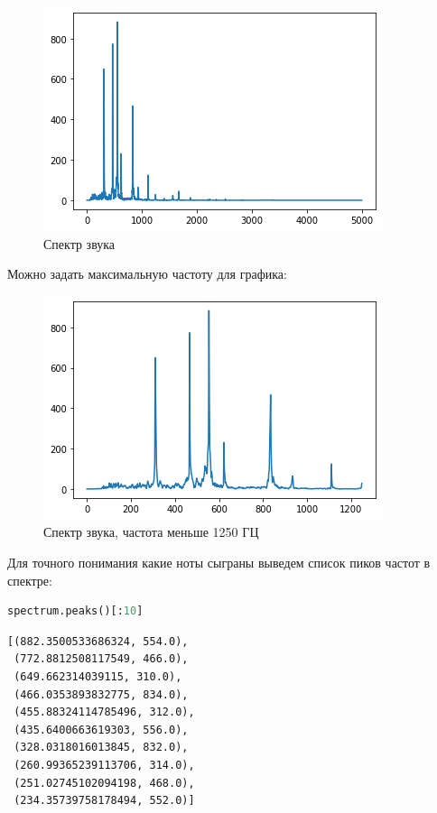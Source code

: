 \begin{figure}[H]
	\begin{center}
		\includegraphics[scale=1]{fig/lab01/lab01_11_0.png}
		\caption{Спектр звука}
	\end{center}
\end{figure}

Можно задать максимальную частоту для графика:

\begin{figure}[H]
	\begin{center}
		\includegraphics[scale=1]{fig/lab01/lab01_13_0.png}
		\caption{Спектр звука, частота меньше 1250 ГЦ}
	\end{center}
\end{figure}

Для точного понимания какие ноты сыграны выведем список пиков частот в спектре:

\begin{lstlisting}[language=Python]
spectrum.peaks()[:10]
\end{lstlisting}

\begin{lstlisting}
[(882.3500533686324, 554.0),
 (772.8812508117549, 466.0),
 (649.662314039115, 310.0),
 (466.0353893832775, 834.0),
 (455.88324114785496, 312.0),
 (435.6400663619303, 556.0),
 (328.0318016013845, 832.0),
 (260.99365239113706, 314.0),
 (251.02745102094198, 468.0),
 (234.35739758178494, 552.0)]
\end{lstlisting}



